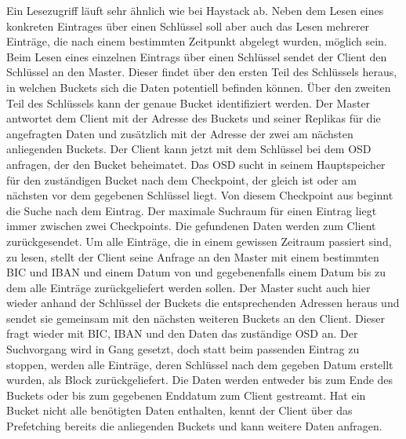 \documentclass[12pt,oneside,a4paper,parskip]{scrbook}
\begin{document}
Ein Lesezugriff läuft sehr ähnlich wie bei Haystack ab. Neben dem Lesen eines konkreten Eintrages über einen Schlüssel soll aber auch das Lesen mehrerer Einträge, die nach einem bestimmten Zeitpunkt abgelegt wurden, möglich sein. Beim Lesen eines einzelnen Eintrags über einen Schlüssel sendet der Client den Schlüssel an den Master. Dieser findet über den ersten Teil des Schlüssels heraus, in welchen Buckets sich die Daten potentiell befinden können. Über den zweiten Teil des Schlüssels kann der genaue Bucket identifiziert werden. Der Master antwortet dem Client mit der Adresse des Buckets und seiner Replikas für die angefragten Daten und zusätzlich mit der Adresse der zwei am nächsten anliegenden Buckets. Der Client kann jetzt mit dem Schlüssel bei dem OSD anfragen, der den Bucket beheimatet. Das OSD sucht in seinem Hauptspeicher für den zuständigen Bucket nach dem Checkpoint, der gleich ist oder am nächsten vor dem gegebenen Schlüssel liegt. Von diesem Checkpoint aus beginnt die Suche nach dem Eintrag. Der maximale Suchraum für einen Eintrag liegt immer zwischen zwei Checkpoints. Die gefundenen Daten werden zum Client zurückgesendet.  
Um alle Einträge, die in einem gewissen Zeitraum passiert sind, zu lesen, stellt der Client seine Anfrage an den Master mit einem bestimmten BIC und IBAN und einem Datum von und gegebenenfalls einem Datum bis zu dem alle Einträge zurückgeliefert werden sollen. Der Master sucht auch hier wieder anhand der Schlüssel der Buckets die entsprechenden Adressen heraus und sendet sie gemeinsam mit den nächsten weiteren Buckets an den Client. Dieser fragt wieder mit BIC, IBAN und den Daten das zuständige OSD an. Der Suchvorgang wird in Gang gesetzt, doch statt beim passenden Eintrag zu stoppen, werden alle Einträge, deren Schlüssel nach dem gegeben Datum erstellt wurden, als Block zurückgeliefert. Die Daten werden entweder bis zum Ende des Buckets oder bis zum gegebenen Enddatum zum Client gestreamt.
Hat ein Bucket nicht alle benötigten Daten enthalten, kennt der Client über das Prefetching bereits die anliegenden Buckets und kann weitere Daten anfragen.
\end{document}
